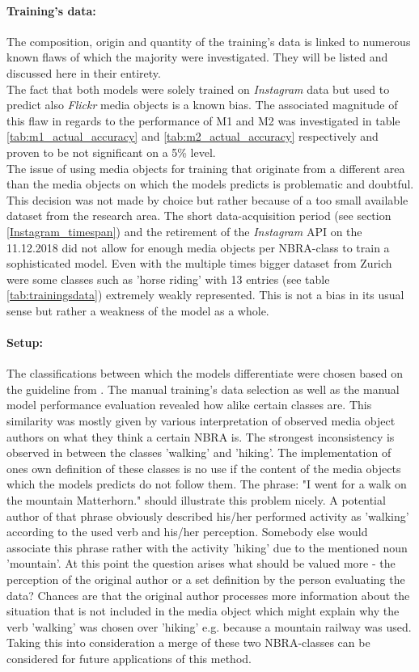 \paragraph*{Training's data:} The composition, origin and quantity of the training's data is linked to numerous known flaws of which the majority were investigated. They will be listed and discussed here in their entirety. \\
The fact that both models were solely trained on \textit{Instagram} data but used to predict also \textit{Flickr} media objects is a known bias. The associated magnitude of this flaw in regards to the performance of M1 and M2 was investigated in table \ref{tab:m1_actual_accuracy} and \ref{tab:m2_actual_accuracy} respectively and proven to be not significant on a 5\% level. \\
The issue of using media objects for training that originate from a different area than the media objects on which the models predicts is problematic and doubtful. This decision was not made by choice but rather because of a too small available dataset from the research area. The short data-acquisition period (see section \ref{Instagram_timespan}) and the retirement of the \textit{Instagram} API on the 11.12.2018 did not allow for enough media objects per NBRA-class to train a sophisticated model. Even with the multiple times bigger dataset from Zurich were some classes such as 'horse riding' with 13 entries (see table \ref{tab:trainingsdata}) extremely weakly represented. This is not a bias in its usual sense but rather a weakness of the model as a whole.

\paragraph*{Setup:} 
The classifications between which the models differentiate were chosen based on the guideline from \parencite{IFL2018}. The manual training's data selection as well as the manual model performance evaluation revealed how alike certain classes are. This similarity was mostly given by various interpretation of observed media object authors on what they think a certain NBRA is. The strongest inconsistency is observed in between the classes 'walking' and 'hiking'. The implementation of ones own definition of these classes is no use if the content of the media objects which the models predicts do not follow them. The phrase: "I went for a walk on the mountain Matterhorn." should illustrate this problem nicely. A potential author of that phrase obviously described his/her performed activity as 'walking' according to the used verb and his/her perception. Somebody else would associate this phrase rather with the activity 'hiking' due to the mentioned noun 'mountain'. At this point the question arises what should be valued more - the perception of the original author or a set definition by the person evaluating the data? Chances are that the original author processes more information about the situation that is not included in the media object which might explain why the verb 'walking' was chosen over 'hiking' e.g. because a mountain railway was used. 
Taking this into consideration a merge of these two NBRA-classes can be considered for future applications of this method.


